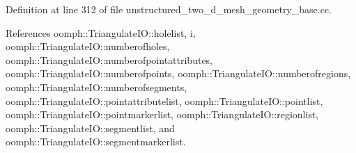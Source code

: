Definition at line 312 of file unstructured\+\_\+two\+\_\+d\+\_\+mesh\+\_\+geometry\+\_\+base.\+cc.



References oomph\+::\+Triangulate\+I\+O\+::holelist, i, oomph\+::\+Triangulate\+I\+O\+::numberofholes, oomph\+::\+Triangulate\+I\+O\+::numberofpointattributes, oomph\+::\+Triangulate\+I\+O\+::numberofpoints, oomph\+::\+Triangulate\+I\+O\+::numberofregions, oomph\+::\+Triangulate\+I\+O\+::numberofsegments, oomph\+::\+Triangulate\+I\+O\+::pointattributelist, oomph\+::\+Triangulate\+I\+O\+::pointlist, oomph\+::\+Triangulate\+I\+O\+::pointmarkerlist, oomph\+::\+Triangulate\+I\+O\+::regionlist, oomph\+::\+Triangulate\+I\+O\+::segmentlist, and oomph\+::\+Triangulate\+I\+O\+::segmentmarkerlist.

